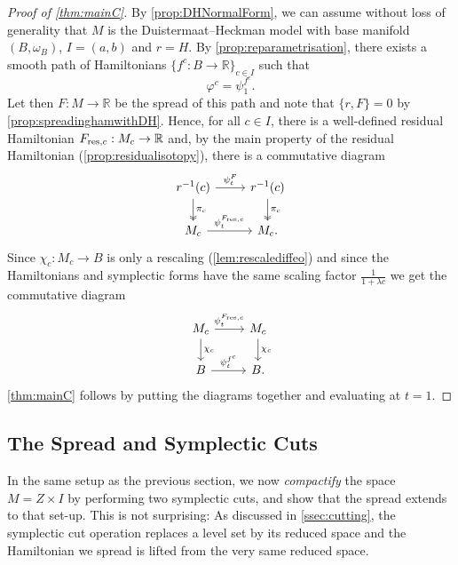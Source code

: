 \documentclass[10pt,oneside,reqno]{amsart}
\theoremstyle{definition}
\newcommand{\IR}{\mathbb{R}}
\newcommand{\resc}{{\textup{res},c}}
\begin{document}
\begin{proof}[Proof of \cref{thm:mainC}]
    By \cref{prop:DHNormalForm}, we can assume without loss of generality that $M$ is the Duistermaat--Heckman model with base manifold $(B,\omega_B)$,  $I=(a,b)$ and $r=H$. By \cref{prop:reparametrisation}, there exists a smooth path of Hamiltonians $\{f^c:B\to \IR\}_{c\in I}$ such that 
    \begin{equation*}
        \varphi^c = \psi_1^{f^c}.
    \end{equation*}
    Let then $F:M \to \IR$ be the spread of this path and note that $\{r,F\}=0$ by \cref{prop:spreadinghamwithDH}. Hence, for all $c\in I$, there is a well-defined residual Hamiltonian $F_\resc:M_c\to \IR$ and, by the main property of the residual Hamiltonian (\cref{prop:residualisotopy}), there is a commutative diagram
    \begin{equation*}
        \begin{tikzcd}
            r^{-1}(c) \arrow[r, "\psi^F_t"] \arrow[d, "\pi_c", two heads] & r^{-1}(c) \arrow[d, "\pi_c", two heads] \\
            M_c \arrow[r, "\psi^{F_\resc}_t"]                             & M_c.                  \end{tikzcd}
    \end{equation*}
    Since $\chi_c:M_c\to B$ is only a rescaling (\cref{lem:rescalediffeo}) and since the Hamiltonians and symplectic forms have the same scaling factor $\frac{1}{1+\lambda c}$ we get the commutative diagram
    \begin{equation*}
        \begin{tikzcd}
M_c \arrow[d, "\chi_c"] \arrow[r, "\psi^{F_\resc}_t"] & M_c \arrow[d, "\chi_c"] \\
B \arrow[r, "\psi^{f^c}_t"]                           & B.                      
\end{tikzcd}
    \end{equation*}
    \cref{thm:mainC} follows by putting the diagrams together and evaluating at $t=1$.
\end{proof}

\subsection{The Spread and Symplectic Cuts} \label{ssec:cutspread}
In the same setup as the previous section, we now \emph{compactify} the space $M = Z \times I$ by performing two symplectic cuts, and show that the spread extends to that set-up. This is not surprising: As discussed in \cref{ssec:cutting}, the symplectic cut operation replaces a level set by its reduced space and the Hamiltonian we spread is lifted from the very same reduced space. 
\end{document}
